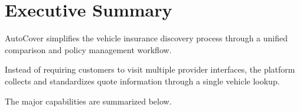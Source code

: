 \documentclass[11pt,a4paper]{article}
\begin{document}

\section{Executive Summary}

AutoCover simplifies the vehicle insurance discovery process through
a unified comparison and policy management workflow.

Instead of requiring customers to visit multiple provider interfaces,
the platform collects and standardizes quote information through a
single vehicle lookup.

The major capabilities are summarized below.
\end{document}
